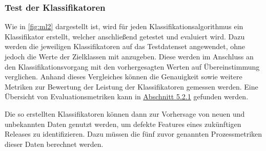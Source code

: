 \subsubsection*{Test der Klassifikatoren}

Wie in \autoref{fig:ml2} dargestellt ist, wird für jeden Klassifikationsalgorithmus ein Klassifikator erstellt, welcher anschließend getestet und evaluiert wird. Dazu werden die jeweiligen Klassifikatoren auf das Testdatenset angewendet, ohne jedoch die Werte der Zielklassen mit anzugeben. Diese werden im Anschluss an den Klassifikationsvorgang mit den vorhergesagten Werten auf Übereinstimmung verglichen. Anhand dieses Vergleiches können die Genauigkeit sowie weitere Metriken zur Bewertung der Leistung der Klassifikatoren gemessen werden. Eine Übersicht von Evaluationsmetriken kann in \hyperref[eval-metrics]{Abschnitt 5.2.1} gefunden werden.

Die so erstellten Klassifikatoren können dann zur Vorhersage von neuen und unbekannten Daten genutzt werden, um defekte Features eines zukünftigen Releases zu identifizieren. Dazu müssen die fünf zuvor genannten Prozessmetriken dieser Daten berechnet werden. 

\cleardoublepage
